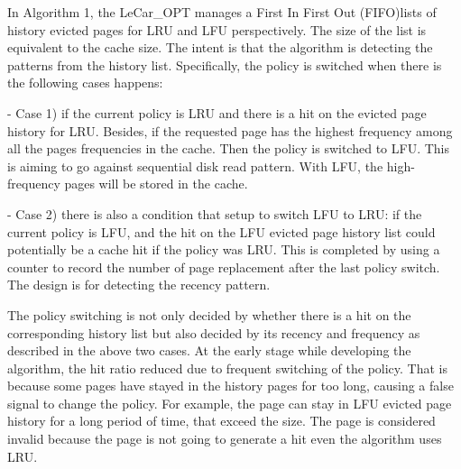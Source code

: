 \documentclass[letterpaper,twocolumn,10pt]{article}
\begin{document}
In Algorithm 1, the LeCar\_OPT manages a First In First Out (FIFO)lists of history evicted pages for LRU and LFU perspectively. The size of the list is equivalent to the cache size. The intent is that the algorithm is detecting the patterns from the history list. Specifically, the policy is switched when there is the following cases happens: 


- Case 1) if the current policy is LRU and there is a hit on the evicted page history for LRU. Besides, if the requested page has the highest frequency among all the pages frequencies in the cache. Then the policy is switched to LFU. This is aiming to go against sequential disk read pattern. With LFU, the high-frequency pages will be stored in the cache. 


- Case 2) there is also a condition that setup to switch LFU to LRU: if the current policy is LFU, and the hit on the LFU evicted page history list could potentially be a cache hit if the policy was LRU. This is completed by using a counter to record the number of page replacement after the last policy switch. The design is for detecting the recency pattern.

The policy switching is not only decided by whether there is a hit on the corresponding history list but also decided by its recency and frequency as described in the above two cases. At the early stage while developing the algorithm, the hit ratio reduced due to frequent switching of the policy. That is because some pages have stayed in the history pages for too long, causing a false signal to change the policy. For example, the page can stay in LFU evicted page history for a long period of time, that exceed the size. The page is considered invalid because the page is not going to generate a hit even the algorithm uses LRU. 
\end{document}
